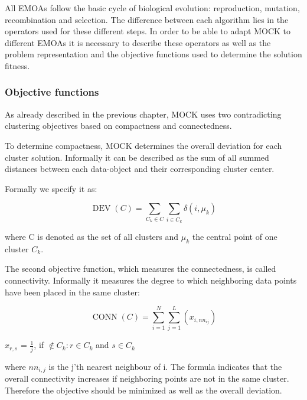 \documentclass[parskip=half,DIV=14]{scrartcl}\usepackage[]{graphicx}\usepackage[]{color}
\begin{document}
All EMOAs follow the basic cycle of biological evolution: reproduction, mutation, recombination and selection. The difference between each algorithm lies in the operators used for these different steps. In order to be able to adapt MOCK to different EMOAs it is necessary to describe these operators as well as the problem representation and the objective functions used to determine the solution fitness.
\subsubsection{Objective functions}

As already described in the previous chapter, MOCK uses two contradicting clustering objectives based on compactness and connectedness.

To determine compactness, MOCK determines the overall deviation for each cluster solution. Informally it can be described as the sum of all summed distances between each data-object and their corresponding cluster center.

Formally we specify it as:

\begin{displaymath}
\operatorname{DEV}(C) = \sum_{C_k \in C} \sum_{i \in C_k} \delta(i,\mu_k)
\end{displaymath}

where C is denoted as the set of all clusters and $\mu_k$ the central point of one cluster $C_k$.

The second objective function, which measures the connectedness, is called connectivity. Informally it measures the degree to which neighboring data points have been placed in the same cluster\cite{handl}:


\begin{displaymath}
\operatorname{CONN}(C) = \sum_{i=1}^N \sum_{j=1}^L (x_{i,nn_{ij}})
\end{displaymath}

\begin{center}
$x_{r,s}$ = $\frac{1}{j}$, if $\notin C_k:r\in C_k$ and $s\in C_k$
\end{center}

where $nn_{i,j}$ is the j'th nearest neighbour of i. The formula indicates that the overall connectivity increases if neighboring points are not in the same cluster. Therefore the objective should be minimized as well as the overall deviation.
\end{document}
